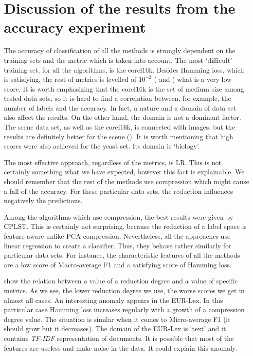 \documentclass[english,a4paper,twoside]{ppfcmthesis}
\begin{document}
\section{Discussion of the results from the accuracy experiment}

The accuracy of classification of all the methods is strongly dependent on the training sets and the metric which is taken into account. The most `difficult' training set, for all the algorithms, is the corel16k. Besides Hamming loss, which is satisfying, the rest of metrics is levelled of $10^{-2}$ ( and ) what is a very low score. It is worth emphasizing that the corel16k is the set of medium size among tested data sets, so it is hard to find a correlation between, for example, the number of labels and the accuracy. In fact, a nature and a domain of data set also affect the results. On the other hand, the domain is not a dominant factor. The scene data set, as well as the corel16k, is connected with images, but the results are definitely better for the scene (). It is worth mentioning that high scores were also achieved for the yeast set. Its domain is `biology'.

The most effective approach, regardless of the metrics, is LR. This is not certainly something what we have expected, however this fact is explainable. We should remember that the rest of the methods use compression which might cause a fall of the accuracy. For these particular data sets, the reduction influences negatively the predictions. 

Among the algorithms which use compression, the best results were given by CPLST. This is certainly not surprising, because the reduction of a label space is feature aware unlike PCA compression. Nevertheless, all the approaches use linear regression to create a classifier. Thus, they behave rather similarly for particular data sets. For instance, the characteristic features of all the methods are a low score of Macro-average F1 and a satisfying score of Hamming loss. 

 show the relation between a value of a reduction degree and a value of specific metrics. As we see, the lower reduction degree we use, the worse scores we get in almost all cases. An interesting anomaly appears in the EUR-Lex. In this particular case Hamming loss increases regularly with a growth of a compression degree value. The situation is similar when it comes to Micro-average F1 (it should grow but it decreases). The domain of the EUR-Lex is `text' and it contains \textit{TF-IDF} representation of documents. It is possible that most of the features are useless and make noise in the data. It could explain this anomaly.  
\end{document}

